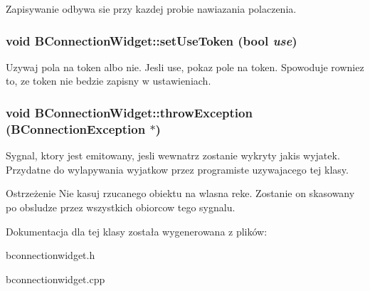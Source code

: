 Zapisywanie odbywa sie przy kazdej probie nawiazania polaczenia. \hypertarget{class_b_connection_widget_a80d71ca868172dc623b9fa6c1ab938a6}{
\subsubsection[{setUseToken}]{\setlength{\rightskip}{0pt plus 5cm}void BConnectionWidget::setUseToken (bool {\em use})}}
\label{class_b_connection_widget_a80d71ca868172dc623b9fa6c1ab938a6}


Uzywaj pola na token albo nie. Jesli use, pokaz pole na token. Spowoduje rowniez to, ze token nie bedzie zapisny w ustawieniach. \hypertarget{class_b_connection_widget_a8d14da5ae492c481f88adfbcdabf47d2}{
\subsubsection[{throwException}]{\setlength{\rightskip}{0pt plus 5cm}void BConnectionWidget::throwException ({\bf BConnectionException} $\ast$)}}
\label{class_b_connection_widget_a8d14da5ae492c481f88adfbcdabf47d2}


Sygnal, ktory jest emitowany, jesli wewnatrz zostanie wykryty jakis wyjatek. Przydatne do wylapywania wyjatkow przez programiste uzywajacego tej klasy.

\begin{DoxyWarning}{Ostrzeżenie}
Nie kasuj rzucanego obiektu na wlasna reke. Zostanie on skasowany po obsludze przez wszystkich obiorcow tego sygnalu. 
\end{DoxyWarning}


Dokumentacja dla tej klasy została wygenerowana z plików:\begin{DoxyCompactItemize}
\item 
bconnectionwidget.h\item 
bconnectionwidget.cpp\end{DoxyCompactItemize}

